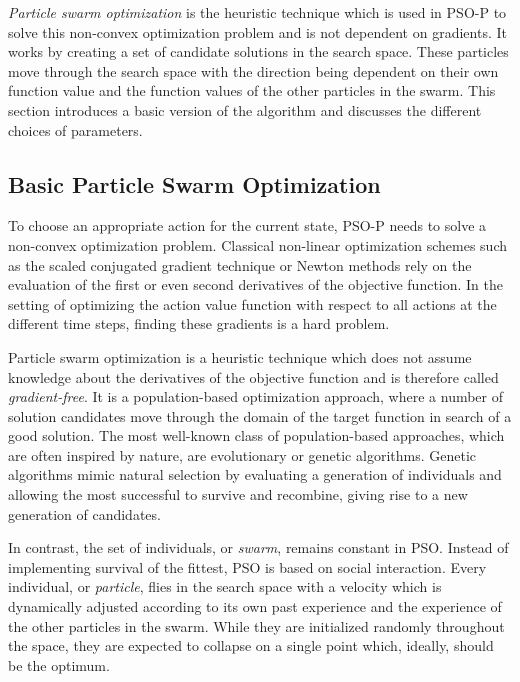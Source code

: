 \emph{Particle swarm optimization} is the heuristic technique which is used in {PSO-P} to solve this non-convex optimization problem and is not dependent on gradients.
It works by creating a set of candidate solutions in the search space.
These particles move through the search space with the direction being dependent on their own function value and the function values of the other particles in the swarm.
This section introduces a basic version of the algorithm and discusses the different choices of parameters.

\subsection{Basic Particle Swarm Optimization}
To choose an appropriate action for the current state, PSO-P needs to solve a non-convex optimization problem.
Classical non-linear optimization schemes such as the scaled conjugated gradient technique or Newton methods \cite{press_numerical_2007} rely on the evaluation of the first or even second derivatives of the objective function.
In the setting of optimizing the action value function with respect to all actions at the different time steps, finding these gradients is a hard problem.

Particle swarm optimization is a heuristic technique which does not assume knowledge about the derivatives of the objective function and is therefore called \emph{gradient-free}.
It is a population-based optimization approach, where a number of solution candidates move through the domain of the target function in search of a good solution.
The most well-known class of population-based approaches, which are often inspired by nature, are evolutionary or genetic algorithms.
Genetic algorithms mimic natural selection by evaluating a generation of individuals and allowing the most successful to survive and recombine, giving rise to a new generation of candidates.

In contrast, the set of individuals, or \emph{swarm}, remains constant in PSO.
Instead of implementing survival of the fittest, PSO is based on social interaction.
Every individual, or \emph{particle}, flies in the search space with a velocity which is dynamically adjusted according to its own past experience and the experience of the other particles in the swarm.
While they are initialized randomly throughout the space, they are expected to collapse on a single point which, ideally, should be the optimum.

